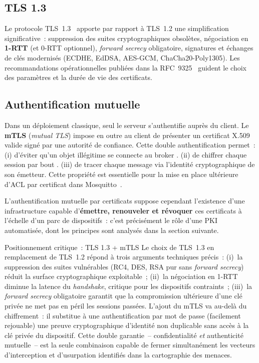 \subsection{TLS 1.3}

Le protocole \acs{TLS}~1.3~\cite{rfc8446} apporte par rapport à TLS~1.2 une simplification significative~: suppression des suites cryptographiques obsolètes, négociation en \textbf{1-RTT} (et 0-RTT optionnel), \emph{forward secrecy} obligatoire, signatures et échanges de clés modernisés (ECDHE, EdDSA, AES-GCM, ChaCha20-Poly1305). Les recommandations opérationnelles publiées dans la \acs{RFC}~9325~\cite{rfc9325} guident le choix des paramètres et la durée de vie des certificats.

\subsection{Authentification mutuelle}

Dans un déploiement classique, seul le serveur s'authentifie auprès du client. Le \textbf{mTLS} (\emph{mutual TLS}) impose en outre au client de présenter un certificat X.509 valide signé par une autorité de confiance. Cette double authentification permet~: (i) d'éviter qu'un objet illégitime se connecte au broker . (ii) de chiffrer chaque session par bout . (iii) de tracer chaque message via l'identité cryptographique de son émetteur. Cette propriété est essentielle pour la mise en place ultérieure d'\acs{ACL} par certificat dans Mosquitto~\cite{mosquitto_tls}.

L'authentification mutuelle par certificats suppose cependant l'existence d'une infrastructure capable d'\textbf{émettre, renouveler et révoquer} ces certificats à l'échelle d'un parc de dispositifs~: c'est précisément le rôle d'une PKI automatisée, dont les principes sont analysés dans la section suivante.

\begin{resultbox}{Positionnement critique~: TLS 1.3 + mTLS}
Le choix de TLS~1.3 en remplacement de TLS~1.2 répond à trois arguments techniques précis~: (i)~la suppression des suites vulnérables (RC4, DES, RSA pur sans \emph{forward secrecy}) réduit la surface cryptographique exploitable~; (ii)~la négociation en 1-RTT diminue la latence du \emph{handshake}, critique pour les dispositifs contraints~; (iii)~la \emph{forward secrecy} obligatoire garantit que la compromission ultérieure d'une clé privée ne met pas en péril les sessions passées. L'ajout du mTLS va au-delà du chiffrement~: il substitue à une authentification par mot de passe (facilement rejouable) une preuve cryptographique d'identité non duplicable sans accès à la clé privée du dispositif. Cette double garantie~-- confidentialité \emph{et} authenticité mutuelle~-- est la seule combinaison capable de fermer simultanément les vecteurs d'interception et d'usurpation identifiés dans la cartographie des menaces.
\end{resultbox}

